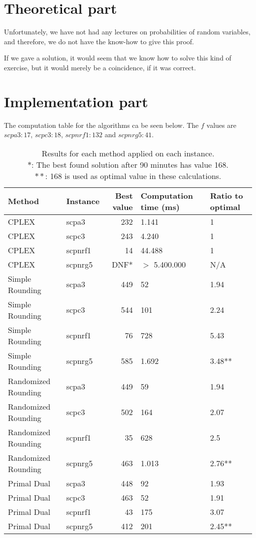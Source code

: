 \section{Theoretical part}
Unfortunately, we have not had any lectures on probabilities of random variables, and therefore, we do not have the know-how to give this proof.

\newpar If we gave a solution, it would seem that we know how to solve this kind of exercise, but it would merely be a coincidence, if it was correct.

\section{Implementation part}
The computation table for the algorithms ca be seen below. The $f$ values are $scpa3: 17$, $scpc3: 18$, $scpnrf1: 132$ and $scpnrg5: 41$.

\begin{table}[H]
	\centering
	\begin{tabularx}{\linewidth}{|X|l|r|X|X|}
		\hline
		\textbf{Method} & \textbf{Instance} & \textbf{Best value} & \textbf{Computation time (ms)} & \textbf{Ratio to optimal}\\\hline
		CPLEX & scpa3 & 232 & 1.141 & 1\\\hline
		CPLEX & scpc3 & 243 & 4.240 & 1\\\hline
		CPLEX & scpnrf1 & 14 & 44.488 & 1\\\hline
		CPLEX & scpnrg5 & DNF* & $>$ 5.400.000 & N/A\\\hline\hline
		Simple Rounding & scpa3 & 449 & 52 & 1.94\\\hline
		Simple Rounding & scpc3 & 544 & 101 & 2.24\\\hline
		Simple Rounding & scpnrf1 & 76 & 728 & 5.43\\\hline
		Simple Rounding & scpnrg5 & 585 & 1.692 & 3.48**\\\hline\hline
		Randomized Rounding & scpa3 & 449 & 59 & 1.94\\\hline
		Randomized Rounding & scpc3 & 502 & 164 & 2.07\\\hline
		Randomized Rounding & scpnrf1 & 35 & 628 & 2.5\\\hline
		Randomized Rounding & scpnrg5 & 463 & 1.013 & 2.76**\\\hline\hline
		Primal Dual & scpa3 & 448 & 92 & 1.93\\\hline
		Primal Dual & scpc3 & 463 & 52 & 1.91\\\hline
		Primal Dual & scpnrf1 & 43 & 175 & 3.07\\\hline
		Primal Dual & scpnrg5 & 412 & 201 & 2.45**\\\hline
	\end{tabularx}
	\caption{Results for each method applied on each instance.\\ $*$: The best found solution after 90 minutes has value 168.\\ $**$: 168 is used as optimal value in these calculations.}
\end{table}

